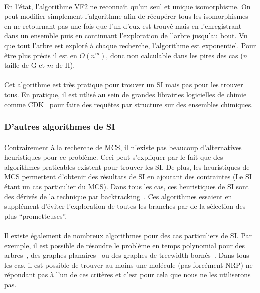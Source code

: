 \documentclass[12pt,french,twoside]{report}
\begin{document}
\paragraph{}En l'état, l'algorithme VF2 ne reconnaît qu'un seul et unique isomorphisme.
On peut modifier simplement l'algorithme afin de récupérer tous les isomorphismes en ne retournant pas une fois que l'un d'eux est
trouvé mais en l'enregistrant dans un ensemble puis en continuant l'exploration de l'arbre jusqu'au bout.
Vu que tout l'arbre est exploré à chaque recherche, l'algorithme est exponentiel.
Pour être plus précis il est en $O(n^m)$, donc non calculable dans les pires des cas ($n$ taille de G et $m$ de H).

\paragraph{}Cet algorithme est très pratique pour trouver un SI mais pas pour les trouver tous.
En pratique, il est utlisé au sein de grandes librairies logicielles de chimie comme CDK~\cite{steinbeck_chemistry_2003} pour faire des requêtes par structure sur des ensembles chimiques.


\subsubsection{D'autres algorithmes de SI}

\paragraph{}Contrairement à la recherche de MCS, il n'existe pas beaucoup d'alternatives heuristiques pour ce problème.
Ceci peut s'expliquer par le fait que des algorithmes praticables existent pour trouver les SI.
De plus, les heuristiques de MCS permettent d'obtenir des résultats de SI en ajoutant des contraintes (Le SI étant un cas particulier du MCS).
Dans tous les cas, ces heuristiques de SI sont des dérivés de la technique par backtracking~\cite{kaijar_developing_2012}.
Ces algorithmes essaient en supplément d'éviter l'exploration de toutes les branches par de la sélection des plus ``prometteuses''.

\paragraph{}Il existe également de nombreux algorithmes pour des cas particuliers de SI.
Par exemple, il est possible de résoudre le problème en temps polynomial pour des arbres~\cite{shamir_faster_1997}, des graphes planaires~\cite{eppstein_subgraph_1995,dorn_planar_2009} ou des graphes de treewidth bornés~\cite{hajiaghayi_subgraph_2007}.
Dans tous les cas, il est possible de trouver au moins une molécule (pas forcément NRP) ne répondant pas à l'un de ces critères et c'est pour cela que nous ne les utiliserons pas.
\end{document}
